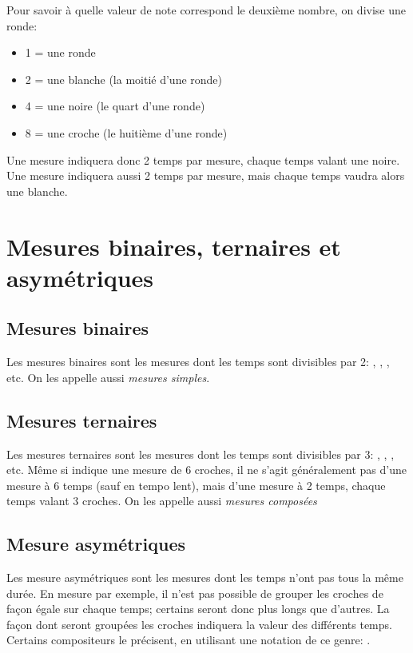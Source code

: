 \documentclass[11pt,a4paper]{scrreprt}
\begin{document}
Pour savoir à quelle valeur de note correspond le deuxième nombre, on divise une ronde:
\begin{itemize}
\item 1 = une ronde
\item 2 = une blanche (la moitié d'une ronde)
\item 4 = une noire (le quart d'une ronde)
\item 8 = une croche (le huitième d'une ronde)
\end{itemize}
Une mesure  indiquera donc 2 temps par mesure, chaque temps valant une noire. Une mesure  indiquera aussi 2 temps par mesure, mais chaque temps vaudra alors une blanche.

\section{Mesures binaires, ternaires et asymétriques}
\subsection{Mesures binaires}
Les mesures binaires sont les mesures dont les temps sont divisibles par 2: , , , etc. On les appelle aussi \emph{mesures simples}.

\subsection{Mesures ternaires}
Les mesures ternaires sont les mesures dont les temps sont divisibles par 3: , , , etc. Même si  indique une mesure de 6 croches, il ne s'agit généralement pas d'une mesure à 6 temps (sauf en tempo lent), mais d'une mesure à 2 temps, chaque temps valant 3 croches. On les appelle aussi \emph{mesures composées}

\subsection{Mesure asymétriques}
Les mesure asymétriques sont les mesures dont les temps n'ont pas tous la même durée. En mesure  par exemple, il n'est pas possible de grouper les croches de façon égale sur chaque temps; certains seront donc plus longs que d'autres. La façon dont seront groupées les croches indiquera la valeur des différents temps. Certains compositeurs le précisent, en utilisant une notation de ce genre: .
\end{document}
